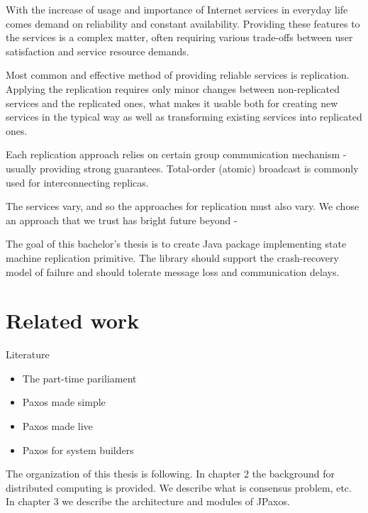
With the increase of usage and importance of Internet services in everyday life comes demand on reliability and constant availability.
Providing these features to the services is a complex matter, often requiring various trade-offs between user satisfaction and service resource demands.

Most common and effective method of providing reliable services is replication. Applying the replication requires only minor changes between non-replicated services and the replicated ones, what makes it usable both for creating new services in the typical way %
as well as transforming existing services into replicated ones.

Each replication approach relies on certain group communication mechanism - usually providing strong guarantees. Total-order (atomic) broadcast is commonly used for interconnecting replicas.


The services vary, and so the approaches for replication must also vary. We chose an approach that we trust has bright future beyond - 


The goal of this bachelor's thesis is to create Java package implementing state machine replication primitive. The library should support the crash-recovery model of failure and should tolerate message loss and communication delays.


\section{Related work}
Literature

\begin{itemize}
  \item The part-time pariliament
  \item Paxos made simple
  \item Paxos made live
  \item Paxos for system builders
\end{itemize}

The organization of this thesis is following. In chapter 2 the background for distributed computing is provided. We describe what is consensus problem, etc. In chapter 3 we describe the architecture and modules of JPaxos.

